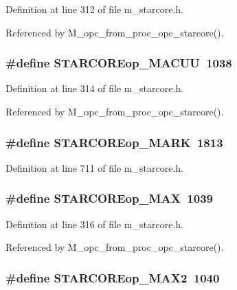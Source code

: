 Definition at line 312 of file m\_\-starcore.h.

Referenced by M\_\-opc\_\-from\_\-proc\_\-opc\_\-starcore().
\subsubsection{\setlength{\rightskip}{0pt plus 5cm}\#define STARCOREop\_\-MACUU~1038}\label{m__starcore_8h_33e40651b8b16d97ffcec5f249b16cd8}




Definition at line 314 of file m\_\-starcore.h.

Referenced by M\_\-opc\_\-from\_\-proc\_\-opc\_\-starcore().
\subsubsection{\setlength{\rightskip}{0pt plus 5cm}\#define STARCOREop\_\-MARK~1813}\label{m__starcore_8h_10da0861813ccecfb66508a8c4485308}




Definition at line 711 of file m\_\-starcore.h.
\subsubsection{\setlength{\rightskip}{0pt plus 5cm}\#define STARCOREop\_\-MAX~1039}\label{m__starcore_8h_b5045ec5c0c78136d9f86001a2ceb70b}




Definition at line 316 of file m\_\-starcore.h.

Referenced by M\_\-opc\_\-from\_\-proc\_\-opc\_\-starcore().
\subsubsection{\setlength{\rightskip}{0pt plus 5cm}\#define STARCOREop\_\-MAX2~1040}\label{m__starcore_8h_8381b1ce5c2a16e68fc1b7bb4bd3426c}




